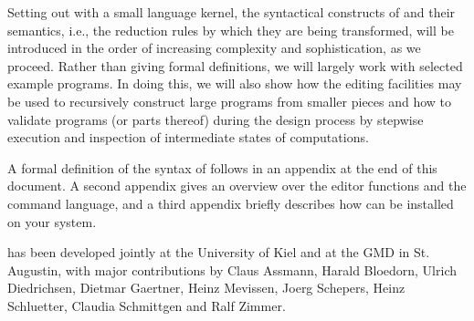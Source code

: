  Setting out with a small language kernel, the syntactical constructs of \kir and their
semantics, i.e., the reduction rules by which they are being transformed,
will be introduced in the order of increasing complexity and sophistication,
as we proceed.
Rather than giving formal definitions, we will  
largely work with selected example programs.
In doing this, we will also show
how the editing facilities may be used to recursively construct large programs
from smaller pieces and how to validate programs (or parts thereof)
during the design process by stepwise execution and inspection of
intermediate states of computations.  

A formal definition of the syntax of \kir follows in an appendix 
at the end of this document. A second appendix gives an overview
over the \pired editor functions and the command language, and a third appendix briefly describes how \pired can be installed on your system.

\pired has been developed jointly at the University of Kiel and at the
 GMD in St. Augustin, with major contributions by Claus Assmann, Harald Bloedorn, 
Ulrich Diedrichsen, Dietmar Gaertner, Heinz Mevissen, Joerg Schepers, Heinz Schluetter,
 Claudia Schmittgen and Ralf Zimmer.

